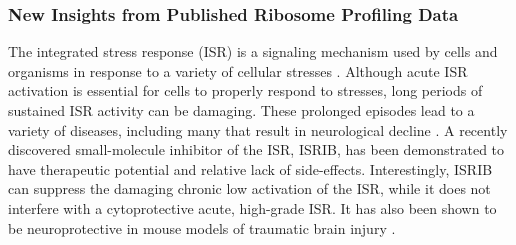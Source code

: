 \documentclass[10pt, oneside]{article}
\begin{document}
\subsubsection{New Insights from Published Ribosome Profiling Data}
The integrated stress response (ISR) is a signaling mechanism used by cells and organisms in response to a variety of cellular stresses \cite{harding_isr}. Although acute ISR activation is essential for cells to properly respond to stresses, long periods of sustained ISR activity can be damaging. These prolonged episodes lead to a variety of diseases, including many that result in neurological decline \cite{isr_disease}. A recently discovered small-molecule inhibitor of the ISR, ISRIB, has been demonstrated to have therapeutic potential and relative lack of side-effects. Interestingly, ISRIB can suppress the damaging chronic low activation of the ISR, while it does not interfere with a cytoprotective acute, high-grade ISR. It has also been shown to be neuroprotective in mouse models of traumatic brain injury \cite{isrib_activation, isrib_structure, isrib_riboseq, isrib_neuroprotective, isrib_neuroprotective2, isrib_neuroprotective3, isrib_neuroprotective4}. \par
\end{document}
